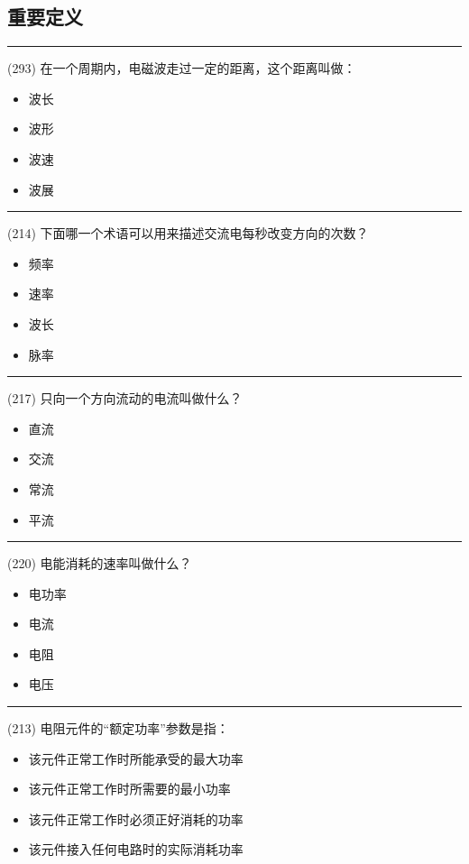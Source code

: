 \documentclass[twocolumn,hyperref,UTF8]{ctexart}  %
\begin{document}
\subsection{重要定义}


\noindent\rule{0.5\textwidth}{1pt}
\heiti (293) 在一个周期内，电磁波走过一定的距离，这个距离叫做： \songti {\color{gray} [LK1106] }
\begin{itemize}
	\item  波长
	\item  波形
	\item  波速
	\item  波展
\end{itemize}


\noindent\rule{0.5\textwidth}{1pt}
\heiti (214) 下面哪一个术语可以用来描述交流电每秒改变方向的次数？ \songti {\color{gray} [LK1107] }
\begin{itemize}
	\item  频率
	\item  速率
	\item  波长
	\item  脉率
\end{itemize}


\noindent\rule{0.5\textwidth}{1pt}
\heiti (217) 只向一个方向流动的电流叫做什么？ \songti {\color{gray} [LK1136] }
\begin{itemize}
	\item  直流
	\item  交流
	\item  常流
	\item  平流
\end{itemize}


\noindent\rule{0.5\textwidth}{1pt}
\heiti (220) 电能消耗的速率叫做什么？ \songti {\color{gray} [LK1140] }
\begin{itemize}
	\item  电功率
	\item  电流
	\item  电阻
	\item  电压
\end{itemize}


\noindent\rule{0.5\textwidth}{1pt}
\heiti (213) 电阻元件的“额定功率”参数是指： \songti {\color{gray} [LK0577] }
\begin{itemize}
	\item  该元件正常工作时所能承受的最大功率
	\item  该元件正常工作时所需要的最小功率
	\item  该元件正常工作时必须正好消耗的功率
	\item  该元件接入任何电路时的实际消耗功率
\end{itemize}
\end{document}
